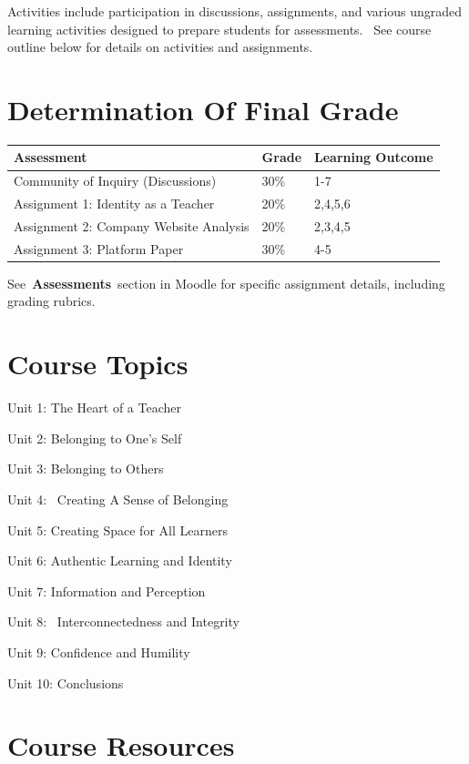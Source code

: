 \documentclass[
]{book}
\begin{document}
Activities include participation in discussions, assignments, and various ungraded learning activities designed to prepare students for assessments.~ See course outline below for details on activities and assignments.

\hypertarget{determination-of-final-grade}{%
\section*{Determination Of Final Grade}\label{determination-of-final-grade}}

\begin{longtable}[]{@{}lll@{}}
\toprule\noalign{}
\textbf{Assessment} & \textbf{Grade} & Learning Outcome \\
\midrule\noalign{}
\endhead
\bottomrule\noalign{}
\endlastfoot
Community of Inquiry (Discussions) & 30\% & 1-7 \\
Assignment 1: Identity as a Teacher~ & 20\% & 2,4,5,6 \\
Assignment 2: Company Website Analysis & 20\% & 2,3,4,5 \\
Assignment 3: Platform Paper & 30\% & 4-5 \\
\end{longtable}

See~\textbf{Assessments}~section in Moodle for specific assignment details, including
grading rubrics.

\hypertarget{course-topics}{%
\section*{Course Topics}\label{course-topics}}

Unit 1: The Heart of a Teacher

Unit 2: Belonging to One's Self

Unit 3: Belonging to Others

Unit 4: ~Creating A Sense of Belonging

Unit 5: Creating Space for All Learners

Unit 6: Authentic Learning and Identity

Unit 7: Information and Perception

Unit 8: ~Interconnectedness and Integrity

Unit 9: Confidence and Humility

Unit 10: Conclusions

\hypertarget{course-resources}{%
\section*{Course Resources}\label{course-resources}}
\end{document}
